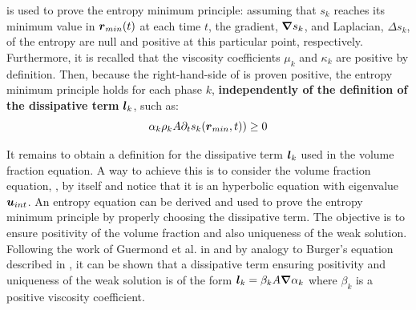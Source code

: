 %
 is used to prove the entropy minimum principle: assuming that $s_k$ reaches its minimum value in $\boldsymbol r_{min}(t)$ at each time $t$, the gradient, $\boldsymbol{\nabla} s_k$, and Laplacian, $\Delta s_k$,  of the entropy are null and positive at this particular point, respectively. Furthermore, it is recalled that the viscosity coefficients $\mu_k$ and $\kappa_k$ are positive by definition. Then, because the right-hand-side of  is proven positive, the entropy minimum principle holds for each phase $k$, \textbf{independently of the definition of the dissipative term} $\boldsymbol l_k$, such as:
%
\begin{equation}\label{eq:ent-res-7-eqn-diss-terms4}
\alpha_k \rho_k A \partial_t s_k(\boldsymbol r_{min},t)) \geq 0 \nonumber
\end{equation}
%

It remains to obtain a definition for the
dissipative term $\boldsymbol l_k$ used in the volume fraction equation. A way to achieve this is to
consider the volume fraction equation, , by itself and notice that it is an hyperbolic equation
with eigenvalue $\boldsymbol u_{int}$. An entropy equation can be derived and used to prove the
entropy minimum principle by properly choosing the dissipative term. The objective is to
ensure positivity of the volume fraction and also uniqueness of the weak solution. Following
the work of Guermond et al. in \cite{jlg1, jlg2} and by analogy
to Burger's equation described in , it can be shown that a dissipative term ensuring positivity and
uniqueness of the weak solution is of the form $\boldsymbol l_k = \beta_k A \boldsymbol{\nabla} \alpha_k $ where $\beta_k$
is a positive viscosity coefficient.

